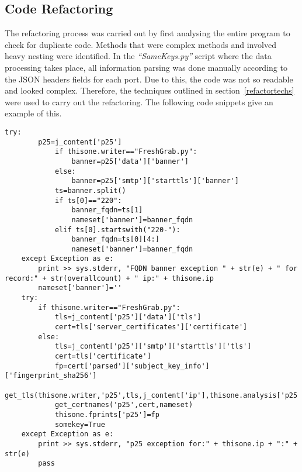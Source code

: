 \subsection{Code Refactoring}
The refactoring process was carried out by first analysing the entire program to check for duplicate code. Methods that were complex methods and involved heavy 
nesting were identified. In the \textit{``SameKeys.py''} script where the data processing takes place, all information parsing was done manually according 
to the JSON headers fields for each port. Due to this, the code was not so readable and looked complex. Therefore, the techniques 
outlined in section~\ref*{refactortechs} were used to carry out the refactoring. The following code snippets give an example of this. 

\begin{lstlisting}[caption={Code before Refactoring}, captionpos=b, label={codebefore}]
    try:
        p25=j_content['p25']
            if thisone.writer=="FreshGrab.py":
                banner=p25['data']['banner'] 
            else:
                banner=p25['smtp']['starttls']['banner'] 
            ts=banner.split()
            if ts[0]=="220":
                banner_fqdn=ts[1]
                nameset['banner']=banner_fqdn
            elif ts[0].startswith("220-"):
                banner_fqdn=ts[0][4:]
                nameset['banner']=banner_fqdn
    except Exception as e: 
        print >> sys.stderr, "FQDN banner exception " + str(e) + " for record:" + str(overallcount) + " ip:" + thisone.ip
        nameset['banner']=''
    try:
        if thisone.writer=="FreshGrab.py":
            tls=j_content['p25']['data']['tls']
            cert=tls['server_certificates']['certificate']
        else:
            tls=j_content['p25']['smtp']['starttls']['tls']
            cert=tls['certificate']
            fp=cert['parsed']['subject_key_info']['fingerprint_sha256'] 
            get_tls(thisone.writer,'p25',tls,j_content['ip'],thisone.analysis['p25'],scandate)
            get_certnames('p25',cert,nameset)
            thisone.fprints['p25']=fp
            somekey=True
    except Exception as e: 
        print >> sys.stderr, "p25 exception for:" + thisone.ip + ":" + str(e)
        pass   
\end{lstlisting}
